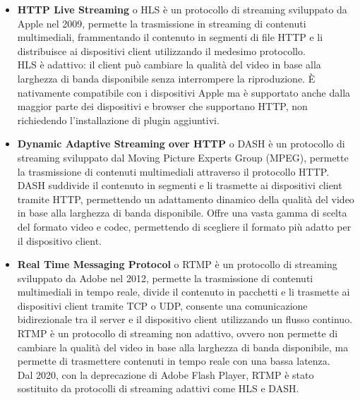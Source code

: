 \begin{itemize}

    \item \textbf{HTTP Live Streaming} o HLS è un protocollo di streaming sviluppato da Apple nel 2009, permette la trasmissione in streaming di contenuti multimediali,
    frammentando il contenuto in segmenti di file HTTP e li distribuisce ai dispositivi client utilizzando il medesimo protocollo.\\
    HLS è adattivo: il client può cambiare la qualità del video in base alla larghezza di banda disponibile senza interrompere la riproduzione.
    È nativamente compatibile con i dispositivi Apple ma è supportato anche dalla maggior parte dei dispositivi e browser che supportano HTTP, non richiedendo l'installazione di plugin aggiuntivi.\\

    \item \textbf{Dynamic Adaptive Streaming over HTTP} o DASH è un protocollo di streaming sviluppato dal Moving Picture Experts Group (MPEG), permette la trasmissione di contenuti multimediali
    attraverso il protocollo HTTP.\\
    DASH suddivide il contenuto in segmenti e li trasmette ai dispositivi client tramite HTTP, permettendo un adattamento dinamico della qualità del video in base alla larghezza di banda disponibile.
    Offre una vasta gamma di scelta del formato video e codec, permettendo di scegliere il formato più adatto per il dispositivo client.\\

    \item \textbf{Real Time Messaging Protocol} o RTMP è un protocollo di streaming sviluppato da Adobe nel 2012, permette la trasmissione di contenuti multimediali in tempo reale,
    divide il contenuto in pacchetti e li trasmette ai dispositivi client tramite TCP o UDP, consente una comunicazione bidirezionale tra il server e il dispositivo client utilizzando un flusso continuo.\\
    RTMP è un protocollo di streaming non adattivo, ovvero non permette di cambiare la qualità del video in base alla larghezza di banda disponibile, ma permette di 
    trasmettere contenuti in tempo reale con una bassa latenza.\\
    Dal 2020, con la deprecazione di Adobe Flash Player, RTMP è stato sostituito da protocolli di streaming adattivi come HLS e DASH.\\
    \end{itemize}

